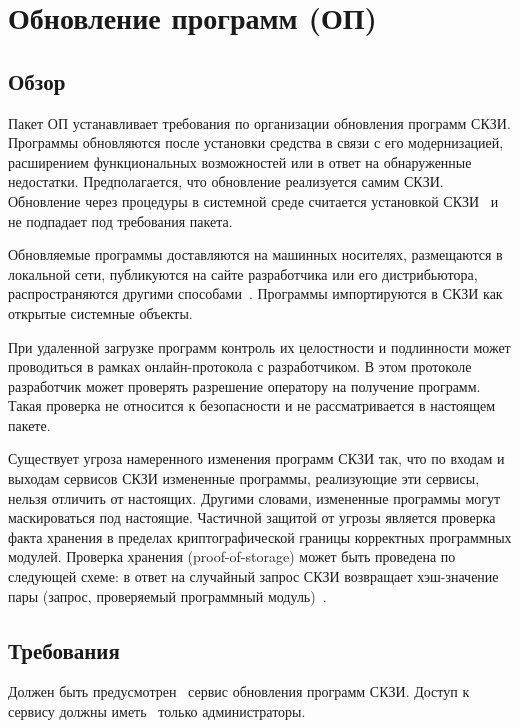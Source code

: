 \section{Обновление программ (ОП)}\label{SU}

\subsection{Обзор}\label{SU.Intro}

Пакет ОП устанавливает требования по организации обновления программ СКЗИ.
Программы обновляются после установки средства в связи с его модернизацией, 
расширением функциональных возможностей или в ответ на обнаруженные недостатки.
%
Предполагается, что обновление реализуется самим СКЗИ. Обновление через 
процедуры в системной среде считается установкой СКЗИ~ 
и не подпадает под требования пакета.

Обновляемые программы доставляются на машинных носителях,
размещаются в локальной сети, публикуются на сайте разработчика или 
его дистрибьютора, распространяются другими способами~.
%
Программы импортируются в СКЗИ как открытые системные объекты.

При удаленной загрузке программ контроль их целостности и подлинности может
проводиться в рамках онлайн-протокола с разработчиком. В этом протоколе
разработчик может проверять разрешение оператору на получение программ. Такая
проверка не относится к безопасности и не рассматривается в настоящем пакете.

Существует угроза намеренного изменения программ СКЗИ так, что по
входам и выходам сервисов СКЗИ измененные программы, реализующие эти сервисы, 
нельзя отличить от настоящих. Другими словами, измененные программы могут 
маскироваться под настоящие. Частичной защитой от угрозы является проверка 
факта хранения в пределах криптографической границы корректных программных 
модулей. Проверка хранения (proof-of-storage) может быть проведена по следующей 
схеме: в ответ на случайный запрос СКЗИ возвращает хэш-значение пары (запрос, 
проверяемый программный модуль)~.

\subsection{Требования}\label{SU.Reqs}

\label{R.SU.Service} %
Должен быть предусмотрен~ сервис обновления 
программ СКЗИ. Доступ к сервису должны иметь~ 
только администраторы.

